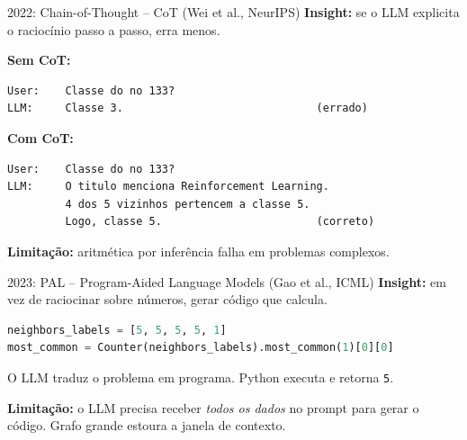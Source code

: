 \documentclass{beamer}
\begin{document}
\begin{frame}[fragile]{2022: Chain-of-Thought -- CoT (Wei et al., NeurIPS)}
  \textbf{Insight:} se o LLM explicita o raciocínio passo a passo, erra menos.

  \vspace{0.5em}
  \textbf{Sem CoT:}
  \begin{lstlisting}[basicstyle=\ttfamily\scriptsize]
User:    Classe do no 133?
LLM:     Classe 3.                              (errado)
  \end{lstlisting}

  \vspace{0.3em}
  \textbf{Com CoT:}
  \begin{lstlisting}[basicstyle=\ttfamily\scriptsize]
User:    Classe do no 133?
LLM:     O titulo menciona Reinforcement Learning.
         4 dos 5 vizinhos pertencem a classe 5.
         Logo, classe 5.                        (correto)
  \end{lstlisting}

  \vspace{0.5em}
  \textbf{Limitação:} aritmética por inferência falha em problemas complexos.
\end{frame}

\begin{frame}[fragile]{2023: PAL -- Program-Aided Language Models (Gao et al., ICML)}
  \textbf{Insight:} em vez de raciocinar sobre números, gerar código que calcula.

  \vspace{0.3em}
  \begin{lstlisting}[language=Python, basicstyle=\ttfamily\scriptsize]
neighbors_labels = [5, 5, 5, 5, 1]
most_common = Counter(neighbors_labels).most_common(1)[0][0]
  \end{lstlisting}

  \vspace{0.3em}
  O LLM traduz o problema em programa. Python executa e retorna \texttt{5}.

  \vspace{0.5em}
  \textbf{Limitação:} o LLM precisa receber \emph{todos os dados} no prompt para gerar o código. Grafo grande estoura a janela de contexto.
\end{frame}
\end{document}
